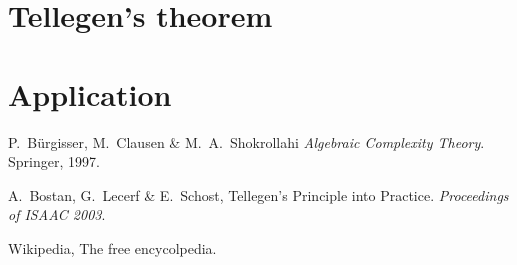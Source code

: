 \documentclass{article}
\begin{document}
  \section{Tellegen's theorem}
  
  \section{Application}


  
  \begin{thebibliography}{1}
    
  P.~Bürgisser, M.~Clausen \& M.~A.~Shokrollahi
    \emph{Algebraic Complexity Theory}.
    Springer, 1997.
    
  A.~Bostan, G.~Lecerf \& E.~Schost,
    Tellegen's Principle into Practice.
    \emph{Proceedings of ISAAC 2003}.

  Wikipedia, The free encycolpedia.
  
  \end{thebibliography}
\end{document}
